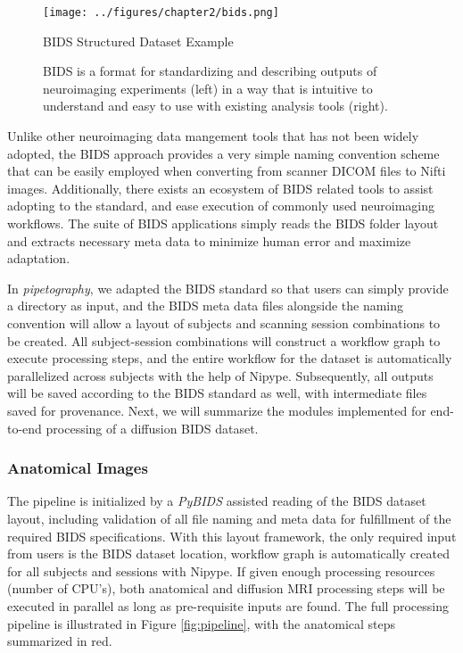 \begin{figure}[htbp]
    \centering
    \texttt{[image: ../figures/chapter2/bids.png]}
    \caption{BIDS Structured Dataset Example}
    \caption*{BIDS is a format for standardizing and describing outputs of neuroimaging experiments (left) in a way that is intuitive to understand and easy to use with existing analysis tools (right).}
    \label{fig:bids}
\end{figure}

Unlike other neuroimaging data mangement tools that has not been widely adopted, the BIDS approach provides a very simple naming convention scheme that can be easily employed when converting from scanner DICOM files to Nifti images. Additionally, there exists an ecosystem of BIDS related tools to assist adopting to the standard, and ease execution of commonly used neuroimaging workflows. The suite of BIDS applications simply reads the BIDS folder layout and extracts necessary meta data to minimize human error and maximize adaptation.

In \emph{pipetography}, we adapted the BIDS standard so that users can simply provide a directory as input, and the BIDS meta data files alongside the naming convention will allow a layout of subjects and scanning session combinations to be created. All  subject-session combinations will construct a workflow graph to execute processing steps, and the entire workflow for the dataset is automatically parallelized across subjects with the help of Nipype. Subsequently, all outputs will be saved according to the BIDS standard as well, with intermediate files saved for provenance. Next, we will summarize the modules implemented for end-to-end processing of a diffusion BIDS dataset.

\subsubsection{Anatomical Images}
The pipeline is initialized by a \emph{PyBIDS} \cite{yarkoni_tal_2021_5295700,yarkoni_pybids_2019} assisted reading of the BIDS dataset layout, including validation of all file naming and meta data for fulfillment of the required BIDS specifications. With this layout framework, the only required input from users is the BIDS dataset location, workflow graph is automatically created for all subjects and sessions with Nipype. If given enough processing resources (number of CPU's), both anatomical and diffusion MRI processing steps will be executed in parallel as long as pre-requisite inputs are found. The full processing pipeline is illustrated in Figure \ref{fig:pipeline}, with the anatomical steps summarized in red.

